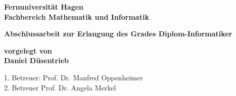 \documentclass[12pt, parskip=half,twopage]{scrreprt}
\begin{document}
\begin{titlepage}
{\bfseries\Large Fernuniversität Hagen \\
Fachbereich Mathematik und Informatik}

\vspace*{4cm}
\begin{center}
\bfseries\Large Abschlussarbeit zur Erlangung des Grades Diplom-Informatiker
\end{center}

\vspace*{2cm}
\begin{center}
\bfseries\Large vorgelegt von \\ Daniel Düsentrieb
\end{center}

\vfill
1. Betreuer: Prof. Dr. Manfred Oppenheimer \\
2. Betreuer Prof. Dr. Angela Merkel 
\end{titlepage}



\tableofcontents

\listoffigures

\listoftables






\end{document}
